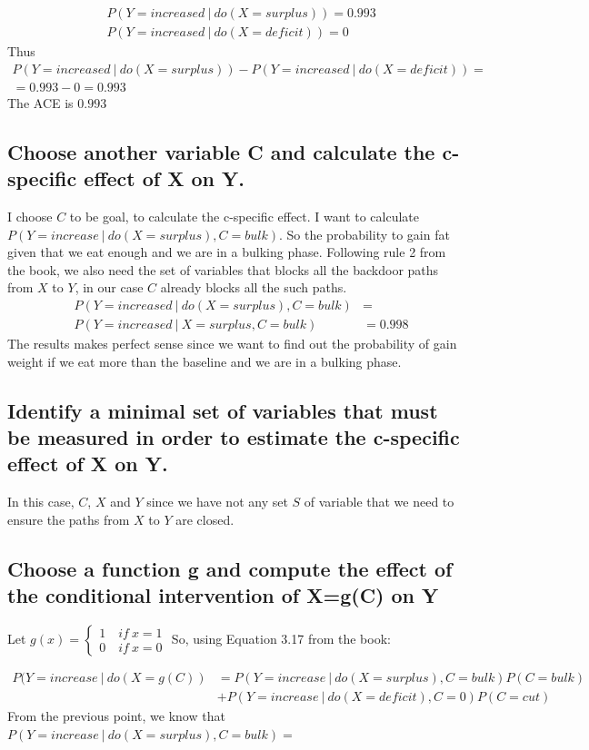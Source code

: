 \documentclass[11pt]{article}
\newcommand\given[1][]{\:#1\vert\:}
\begin{document}
\begin{align}
&P(Y=increased \given do(X=surplus)) = 0.993 \\
&P(Y=increased\given do(X=deficit)) = 0
\end{align}
Thus
\begin{align*}
P(Y=increased \given do(X=surplus)) - P(Y=increased\given do(X=deficit)) = \\
=  0.993 - 0 = 0.993
\end{align*}
The ACE is $0.993$
\subsection{Choose another variable C and calculate the c-specific effect of X on Y.}
I choose $C$ to be goal, to calculate the c-specific effect. I want to calculate $P(Y=increase \given do(X=surplus), C=bulk)$. So the probability to gain fat given that we eat enough and we are in a bulking phase. Following rule 2 from the book, we also need the set of variables that blocks all the backdoor paths from $X$ to $Y$, in our case $C$ already blocks all the such paths.
\begin{align*}
&P(Y=increased \given do(X=surplus), C=bulk) &= \\
& P(Y=increased \given X=surplus, C=bulk) &= 0.998
\end{align*}
The results makes perfect sense since we want to find out the probability of gain weight if we eat more than the baseline and we are in a bulking phase.

\subsection{Identify a minimal set of variables that must be measured in order to estimate the c-specific effect of X on Y.}
In this case, $C$, $X$ and $Y$ since we have not any set $S$ of variable that we need to ensure the paths from $X$ to $Y$ are closed.

\subsection{Choose a function g and compute the effect of the conditional intervention of X=g(C) on Y}
Let $g(x) = 
\begin{cases} 
1 \quad if \ x = 1 \\
0 \quad if \ x =  0 
\end{cases}
$
So, using Equation 3.17 from the book:

\begin{align*}
P (Y = increase \given do(X=g(C)) &=  P(Y=increase \given do(X=surplus),C=bulk)P(C=bulk) \\
&+ P(Y= increase \given do(X=deficit),C=0)P(C=cut)
\end{align*}
From the previous point, we know that $P(Y=increase \given do(X=surplus),C=bulk) =   $
\end{document}
